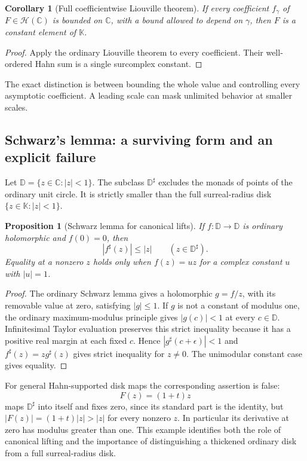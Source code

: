\documentclass[11pt,oneside]{article}
\newtheorem{proposition}[theorem]{Proposition}
\newtheorem{corollary}[theorem]{Corollary}
\theoremstyle{definition}\newtheorem{definition}[theorem]{Definition}
\newcommand{\K}{\mathbb K}
\newcommand{\C}{\mathbb C}
\newcommand{\HH}{\mathcal H}
\newcommand{\Disc}{\mathbb D}
\begin{document}
\begin{corollary}[Full coefficientwise Liouville theorem]
If every coefficient $f_\gamma$ of $F\in\HH(\C)$ is bounded on $\C$, with a bound allowed to depend on $\gamma$, then $F$ is a constant element of $\K$.
\end{corollary}
\begin{proof}
Apply the ordinary Liouville theorem to every coefficient. Their well-ordered Hahn sum is a single surcomplex constant.
\end{proof}
The exact distinction is between bounding the whole value and controlling every asymptotic coefficient. A leading scale can mask unlimited behavior at smaller scales.

\subsection{Schwarz's lemma: a surviving form and an explicit failure}
Let $\Disc=\{z\in\C:|z|<1\}$. The subclass $\Disc^\sharp$ excludes the monads of points of the ordinary unit circle. It is strictly smaller than the full surreal-radius disk $\{z\in\K:|z|<1\}$.

\begin{proposition}[Schwarz lemma for canonical lifts]\label{prop:schwarz}
If $f:\Disc\to\Disc$ is ordinary holomorphic and $f(0)=0$, then
\[
 |f^\sharp(z)|\leq|z|\qquad(z\in\Disc^\sharp).
\]
Equality at a nonzero $z$ holds only when $f(z)=uz$ for a complex constant $u$ with $|u|=1$.
\end{proposition}
\begin{proof}
The ordinary Schwarz lemma gives a holomorphic $g=f/z$, with its removable value at zero, satisfying $|g|\leq1$. If $g$ is not a constant of modulus one, the ordinary maximum-modulus principle gives $|g(c)|<1$ at every $c\in\Disc$. Infinitesimal Taylor evaluation preserves this strict inequality because it has a positive real margin at each fixed $c$. Hence $|g^\sharp(c+\epsilon)|<1$ and $f^\sharp(z)=zg^\sharp(z)$ gives strict inequality for $z\ne0$. The unimodular constant case gives equality.
\end{proof}
For general Hahn-supported disk maps the corresponding assertion is false:
\[
 F(z)=(1+t)z
\]
maps $\Disc^\sharp$ into itself and fixes zero, since its standard part is the identity, but $|F(z)|=(1+t)|z|>|z|$ for every nonzero $z$. In particular its derivative at zero has modulus greater than one. This example identifies both the role of canonical lifting and the importance of distinguishing a thickened ordinary disk from a full surreal-radius disk.
\end{document}
